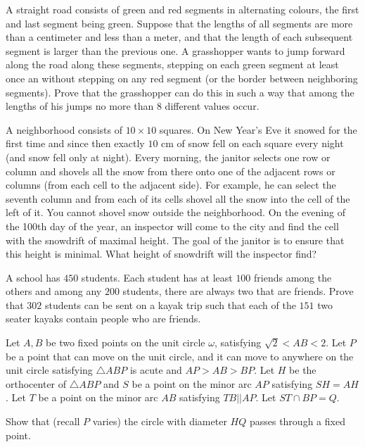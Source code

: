 \documentclass[11pt]{scrartcl}
\begin{document}
\begin{problem}[221644122066923]
A straight road consists of green and red segments in alternating colours, the first and last segment being green. Suppose that the lengths of all segments are more than a centimeter and less than a meter, and that the length of each subsequent segment is larger than the previous one. A grasshopper wants to jump forward along the road along these segments, stepping on each green segment at least once an without stepping on any red segment (or the border between neighboring segments). Prove that the grasshopper can do this in such a way that among the lengths of his jumps no more than $8$ different values occur.
\end{problem}
\begin{problem}[2201137214247796233]
A neighborhood consists of $10 \times 10$ squares. On New Year's Eve it snowed for the first time and since then exactly $10$ cm of snow fell on each square every night (and snow fell only at night). Every morning, the janitor selects one row or column and shovels all the snow from there onto one of the adjacent rows or columns (from each cell to the adjacent side). For example, he can select the seventh column and from each of its cells shovel all the snow into the cell of the left of it. You cannot shovel snow outside the neighborhood. On the evening of the 100th day of the year, an inspector will come to the city and find the cell with the snowdrift of maximal height. The goal of the janitor is to ensure that this height is minimal. What height of snowdrift will the inspector find?
\end{problem}
\begin{problem}[8005762280394288133]
A school has $450$ students. Each student has at least $100$ friends among the others and among any $200$ students, there are always two that are friends. Prove that $302$ students can be sent on a kayak trip such that each of the $151$ two seater kayaks contain people who are friends.
\end{problem}
\begin{problem}[308110166188097]
Let $A,B$ be two fixed points on the unit circle $\omega$, satisfying $\sqrt{2} < AB < 2$. Let $P$ be a point that can move on the unit circle, and it can move to anywhere on the unit circle satisfying $\triangle ABP$ is acute and $AP>AB>BP$. Let $H$ be the orthocenter of $\triangle ABP$ and $S$ be a point on the minor arc $AP$ satisfying $SH=AH$. Let $T$ be a point on the minor arc $AB$ satisfying $TB || AP$. Let $ST\cap BP = Q$.

Show that (recall $P$ varies) the circle with diameter $HQ$ passes through a fixed point.
\end{problem}
\end{document}
